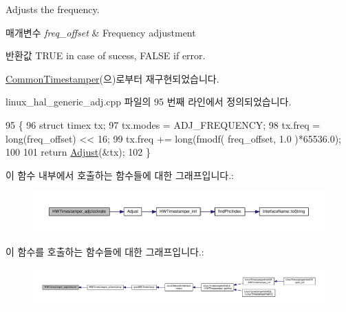 Adjusts the frequency. 


\begin{DoxyParams}{매개변수}
{\em freq\+\_\+offset} & Frequency adjustment \\
\hline
\end{DoxyParams}
\begin{DoxyReturn}{반환값}
T\+R\+UE in case of sucess, F\+A\+L\+SE if error. 
\end{DoxyReturn}


\hyperlink{class_common_timestamper_a557b905a4f8bb20481c28c8dd33cfb21}{Common\+Timestamper}(으)로부터 재구현되었습니다.



linux\+\_\+hal\+\_\+generic\+\_\+adj.\+cpp 파일의 95 번째 라인에서 정의되었습니다.


\begin{DoxyCode}
95                                                                                   \{
96     \textcolor{keyword}{struct }timex tx;
97     tx.modes = ADJ\_FREQUENCY;
98     tx.freq  = long(freq\_offset) << 16;
99     tx.freq += long(fmodf( freq\_offset, 1.0 )*65536.0);
100 
101     \textcolor{keywordflow}{return} \hyperlink{class_linux_timestamper_generic_a1d52a5a84b74222b880522cee01475e1}{Adjust}(&tx);
102 \}
\end{DoxyCode}


이 함수 내부에서 호출하는 함수들에 대한 그래프입니다.\+:
\nopagebreak
\begin{figure}[H]
\begin{center}
\leavevmode
\includegraphics[width=350pt]{class_linux_timestamper_generic_a40688d4900827bb422a3a172614878f8_cgraph}
\end{center}
\end{figure}




이 함수를 호출하는 함수들에 대한 그래프입니다.\+:
\nopagebreak
\begin{figure}[H]
\begin{center}
\leavevmode
\includegraphics[width=350pt]{class_linux_timestamper_generic_a40688d4900827bb422a3a172614878f8_icgraph}
\end{center}
\end{figure}


